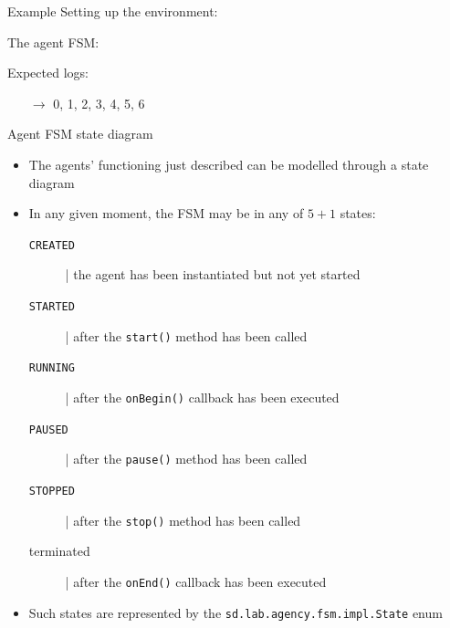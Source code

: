 \documentclass[presentation]{beamer}\mode<presentation>{\usetheme{AMSCesenaPurpleAndGold}}
\begin{document}
\begin{frame}[allowframebreaks]{Example}
    Setting up the environment:
    

    \framebreak

    The agent FSM:
    

    Expected logs:
    \begin{itemize}
    	\item[$\rightarrow$] 0, 1, 2, 3, 4, 5, 6
    \end{itemize}
\end{frame}

\begin{frame}[allowframebreaks]{Agent FSM state diagram}

    \begin{itemize}
        \item The agents' functioning just described can be modelled through a state diagram

        \bigskip

        \item In any given moment, the FSM may be in any of $5+1$ states:
        \begin{description}
            \item[\texttt{CREATED}] | the agent has been instantiated but not yet started

            \item[\texttt{STARTED}] | after the \texttt{start()} method has been called

            \item[\texttt{RUNNING}] | after the \texttt{onBegin()} callback has been executed

            \item[\texttt{PAUSED}] | after the \texttt{pause()} method has been called

            \item[\texttt{STOPPED}] | after the \texttt{stop()} method has been called

            \item[terminated] | after the \texttt{onEnd()} callback has been executed
        \end{description}

    	\bigskip

    	\item Such states are represented by the \texttt{sd.lab.agency.fsm.impl.\alert{State}} enum


\end{itemize}
\end{frame}
\end{document}

